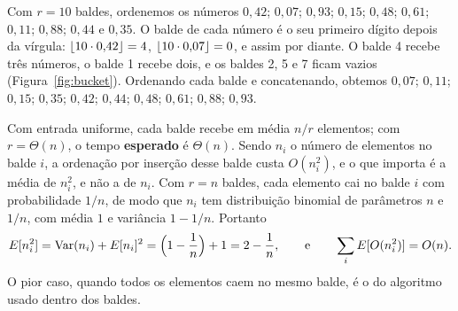 \begin{exemplo}\label{ex:bucket}
Com $r=10$ baldes, ordenemos os números $0{,}42$; $0{,}07$; $0{,}93$; $0{,}15$; $0{,}48$; $0{,}61$; $0{,}11$; $0{,}88$; $0{,}44$ e $0{,}35$. O balde de cada número é o seu primeiro dígito depois da vírgula: $\lfloor10\cdot0{,}42\rfloor=4$, $\lfloor10\cdot0{,}07\rfloor=0$, e assim por diante. O balde 4 recebe três números, o balde 1 recebe dois, e os baldes 2, 5 e 7 ficam vazios (Figura~\ref{fig:bucket}). Ordenando cada balde e concatenando, obtemos $0{,}07$; $0{,}11$; $0{,}15$; $0{,}35$; $0{,}42$; $0{,}44$; $0{,}48$; $0{,}61$; $0{,}88$; $0{,}93$.
\begin{figura}
\end{figura}
\end{exemplo}

Com entrada uniforme, cada balde recebe em média $n/r$ elementos; com $r=\Theta(n)$, o tempo \textbf{esperado} é $\Theta(n)$. Sendo $n_i$ o número de elementos no balde $i$, a ordenação por inserção desse balde custa $O(n_i^2)$, e o que importa é a média de $n_i^2$, e não a de $n_i$. Com $r=n$ baldes, cada elemento cai no balde $i$ com probabilidade $1/n$, de modo que $n_i$ tem distribuição binomial de parâmetros $n$ e $1/n$, com média $1$ e variância $1-1/n$. Portanto
\[
E[n_i^2]=\operatorname{Var}(n_i)+E[n_i]^2=\Bigl(1-\frac1n\Bigr)+1=2-\frac1n,
\qquad\text{e}\qquad \sum_{i}E[O(n_i^2)]=O(n).
\]
O pior caso, quando todos os elementos caem no mesmo balde, é o do algoritmo usado dentro dos baldes.

